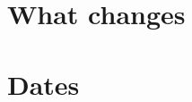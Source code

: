 \documentclass[type=memo, lang=en-GB]{plaindoc}
\begin{document}
\maketitle

\section*{What changes}
\section*{Dates}
\end{document}
